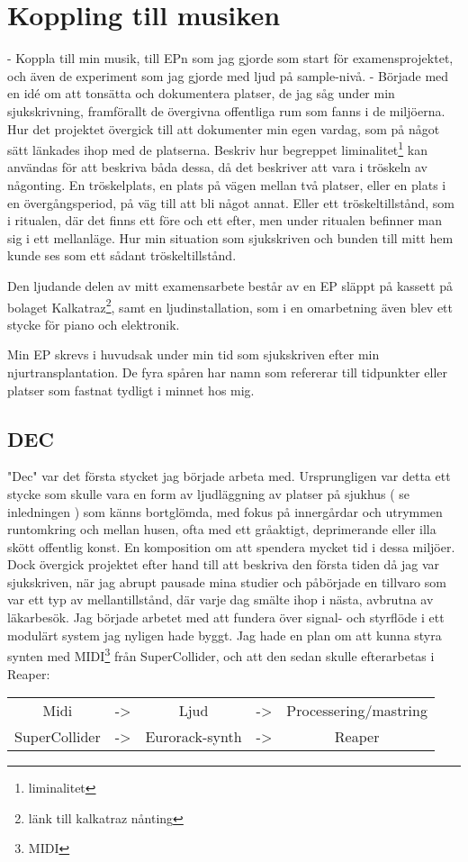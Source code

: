 \documentclass{article}
\begin{document}
\section{Koppling till musiken}
- Koppla till min musik, till EPn som jag gjorde som start för examensprojektet, och även de experiment som
  jag gjorde med ljud på sample-nivå. 
- Började med en idé om att tonsätta och dokumentera platser, de jag såg under min sjukskrivning, framförallt
  de övergivna offentliga rum som fanns i de miljöerna. Hur det projektet övergick till att dokumenter min
  egen vardag, som på något sätt länkades ihop med de platserna. Beskriv hur begreppet
  liminalitet\footnote{liminalitet} kan användas för att beskriva båda dessa, då det beskriver att vara i
  tröskeln av någonting. En tröskelplats, en plats på vägen mellan två platser, eller en plats i en
  övergångsperiod, på väg till att bli något annat. Eller ett tröskeltillstånd, som i ritualen, där det finns
  ett före och ett efter, men under ritualen befinner man sig i ett mellanläge. Hur min situation som
  sjukskriven och bunden till mitt hem kunde ses som ett sådant tröskeltillstånd.

  Den ljudande delen av mitt examensarbete består av en EP släppt på kassett på bolaget
  Kalkatraz\footnote{länk till kalkatraz nånting}, samt en ljudinstallation, som i en omarbetning även blev
  ett stycke för piano och elektronik.

  Min EP skrevs i huvudsak under min tid som sjukskriven efter min njurtransplantation. De fyra spåren har
  namn som refererar till tidpunkter eller platser som fastnat tydligt i minnet hos mig. 
	\subsection{DEC}
	"Dec" var det första stycket jag började arbeta med. Ursprungligen var detta ett stycke som skulle vara en
	form av ljudläggning av platser på sjukhus ( se inledningen ) som känns bortglömda, med fokus på
	innergårdar och utrymmen runtomkring och mellan husen, ofta med ett gråaktigt, deprimerande eller illa
	skött offentlig konst. En komposition om att spendera mycket tid i dessa miljöer. Dock övergick projektet
	efter hand till att beskriva den första tiden då jag var sjukskriven, när jag abrupt pausade mina studier
	och påbörjade en tillvaro som var ett typ av mellantillstånd, där varje dag smälte ihop i nästa, avbrutna
	av läkarbesök. 
		Jag började arbetet med att fundera över signal- och styrflöde i ett modulärt system jag nyligen hade
		byggt. Jag hade en plan om att kunna styra synten med MIDI\footnote{MIDI} från SuperCollider, och att
		den sedan skulle efterarbetas i Reaper:
		\begin{center}
			\begin{tabular}{ c c c c c }
				Midi		  & -> & Ljud			& -> & Processering/mastring \\
				SuperCollider & -> & Eurorack-synth & -> & Reaper
			\end{tabular}
		\end{center}
\end{document}
